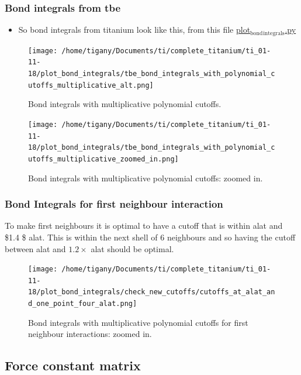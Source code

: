 \documentclass[11pt]{article}
\begin{document}
\subsubsection{Bond integrals from tbe}
\label{sec-2-2-2}
\begin{itemize}
\item So bond integrals from titanium look like this, from this file
\href{file:///home/tigany/Documents/ti/complete_titanium/ti_01-11-18/plot_bond_integrals/plot_bond_integrals.py}{plot$_{\text{bond}}$$_{\text{integrals}}$.py}
\end{itemize}
\begin{figure}[htb]
\centering
\texttt{[image: /home/tigany/Documents/ti/complete\_titanium/ti\_01-11-18/plot\_bond\_integrals/tbe\_bond\_integrals\_with\_polynomial\_cutoffs\_multiplicative\_alt.png]}
\caption{\label{fig:tbe_bond_integrals_with_polynomial_cutoffs_multiplicative_alt.png}Bond integrals with multiplicative polynomial cutoffs.}
\end{figure}
\begin{figure}[htb]
\centering
\texttt{[image: /home/tigany/Documents/ti/complete\_titanium/ti\_01-11-18/plot\_bond\_integrals/tbe\_bond\_integrals\_with\_polynomial\_cutoffs\_multiplicative\_zoomed\_in.png]}
\caption{\label{fig:tbe_bond_integrals_with_polynomial_cutoffs_multiplicative_zoomed_in.png}Bond integrals with multiplicative polynomial cutoffs: zoomed in.}
\end{figure}

\subsubsection{Bond Integrals for first neighbour interaction}
\label{sec-2-2-3}
To make first neighbours it is optimal to have a cutoff that is within
alat and \$1.4 \texttimes{} \$ alat. This is within the next shell of 6 neighbours
and so having the cutoff between alat and $1.2\times$ alat should be
optimal. 
\begin{figure}[htb]
\centering
\texttt{[image: /home/tigany/Documents/ti/complete\_titanium/ti\_01-11-18/plot\_bond\_integrals/check\_new\_cutoffs/cutoffs\_at\_alat\_and\_one\_point\_four\_alat.png]}
\caption{\label{fig:tbe_bond_integrals_new__with_polynomial_cutoffs_multiplicative_zoomed_in.png}Bond integrals with multiplicative polynomial cutoffs for first neighbour interactions: zoomed in.}
\end{figure}

\subsection{Force constant matrix}
\label{sec-2-3}
\end{document}
